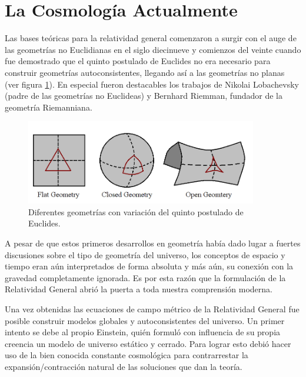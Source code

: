 \section{La Cosmología Actualmente}
\label{sec:TheCurrentCosmologyPicture}


Las bases teóricas para la relatividad general comenzaron a surgir con el 
auge de las geometrías no Euclidianas en el siglo diecinueve y comienzos 
del veinte cuando fue demostrado que el quinto postulado de Euclides no 
era necesario para construir geometrías autoconsistentes, llegando así a las
geometrías no planas (ver figura \ref{fig:NonEuclidean}). En especial fueron 
destacables los trabajos de Nikolai Lobachevsky (padre de las geometrías 
no Euclideas) y Bernhard Riemman, fundador de la geometría Riemanniana.


\begin{figure}[htbp]
	\centering
	\includegraphics[width=0.9\textwidth]{./figures/1_introduction/Non_Euclidean.png}
	
	\caption{\small{Diferentes geometrías con variación del quinto postulado 
	de Euclides.}}
	
	\label{fig:NonEuclidean}
\end{figure}


A pesar de que estos primeros desarrollos en geometría había dado lugar a
fuertes discusiones sobre el tipo de geometría del universo, los conceptos de 
espacio y tiempo eran aún interpretados de forma absoluta y más aún, su 
conexión con la gravedad completamente ignorada. Es por esta razón que 
la formulación de la Relatividad General abrió la puerta a toda nuestra
comprensión moderna.


Una vez obtenidas las ecuaciones de campo métrico de la Relatividad General
fue posible construir modelos globales y autoconsistentes del universo. Un
primer intento se debe al propio Einstein, quién formuló con influencia 
de su propia creencia un modelo de universo estático y cerrado. Para lograr 
esto debió hacer uso de la bien conocida constante cosmológica para 
contrarrestar la expansión/contracción natural de las soluciones que dan 
la teoría.


